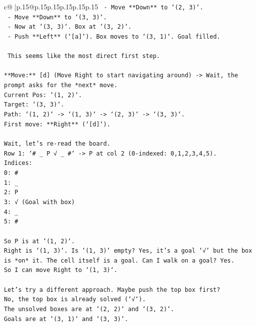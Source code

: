 \documentclass{article}
\begin{document}
{\begin{supertabular}{c@{$\;$}|p{.15\linewidth}@{}p{.15\linewidth}p{.15\linewidth}p{.15\linewidth}p{.15\linewidth}p{.15\linewidth}}
{{{\texttt{    {-}   Move **Down** to `(2, 3)`.} \\
\texttt{    {-}   Move **Down** to `(3, 3)`.} \\
\texttt{    {-}   Now at `(3, 3)`. Box at `(3, 2)`.} \\
\texttt{    {-}   Push **Left** (`{[}a{]}`). Box moves to `(3, 1)`. Goal filled.} \\
\\ 
\texttt{    This seems like the most direct first step.} \\
\\ 
\texttt{**Move:** {[}d{]} (Move Right to start navigating around) {-}> Wait, the prompt asks for the *next* move.} \\
\texttt{Current Pos: `(1, 2)`.} \\
\texttt{Target: `(3, 3)`.} \\
\texttt{Path: `(1, 2)` {-}> `(1, 3)` {-}> `(2, 3)` {-}> `(3, 3)`.} \\
\texttt{First move: **Right** (`{[}d{]}`).} \\
\\ 
\texttt{Wait, let's re{-}read the board.} \\
\texttt{Row 1: `\# \_ P √ \_ \#` {-}> P at col 2 (0{-}indexed: 0,1,2,3,4,5).} \\
\texttt{Indices:} \\
\texttt{0: \#} \\
\texttt{1: \_} \\
\texttt{2: P} \\
\texttt{3: √ (Goal with box)} \\
\texttt{4: \_} \\
\texttt{5: \#} \\
\\ 
\texttt{So P is at `(1, 2)`.} \\
\texttt{Right is `(1, 3)`. Is `(1, 3)` empty? Yes, it's a goal `√` but the box is *on* it. The cell itself is a goal. Can I walk on a goal? Yes.} \\
\texttt{So I can move Right to `(1, 3)`.} \\
\\ 
\texttt{Let's try a different approach. Maybe push the top box first?} \\
\texttt{No, the top box is already solved (`√`).} \\
\texttt{The unsolved boxes are at `(2, 2)` and `(3, 2)`.} \\
\texttt{Goals are at `(3, 1)` and `(3, 3)`.} \\
\\ 
}}}
\end{supertabular}}
\end{document}
